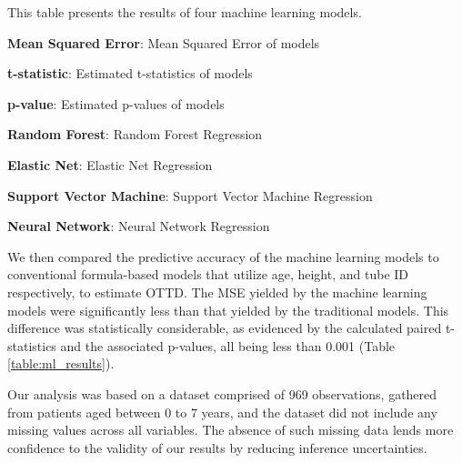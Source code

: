 \documentclass[11pt]{article}
\begin{document}
\begin{table}[h]
\caption{Results of Machine Learning Models}
\label{table:ml_results}
\begin{threeparttable}
\renewcommand{\TPTminimum}{\linewidth}
\begin{tablenotes}
\footnotesize
\item This table presents the results of four machine learning models.
\item \textbf{Mean Squared Error}: Mean Squared Error of models
\item \textbf{t-statistic}: Estimated t-statistics of models
\item \textbf{p-value}: Estimated p-values of models
\item \textbf{Random Forest}: Random Forest Regression
\item \textbf{Elastic Net}: Elastic Net Regression
\item \textbf{Support Vector Machine}: Support Vector Machine Regression
\item \textbf{Neural Network}: Neural Network Regression
\end{tablenotes}
\end{threeparttable}
\end{table}


We then compared the predictive accuracy of the machine learning models to conventional formula-based models that utilize age, height, and tube ID respectively, to estimate OTTD. The MSE yielded by the machine learning models were significantly less than that yielded by the traditional models. This difference was statistically considerable, as evidenced by the calculated paired t-statistics and the associated p-values, all being less than 0.001 (Table {}\ref{table:ml_results}).

Our analysis was based on a dataset comprised of 969 observations, gathered from patients aged between 0 to 7 years, and the dataset did not include any missing values across all variables. The absence of such missing data lends more confidence to the validity of our results by reducing inference uncertainties.
\end{document}
